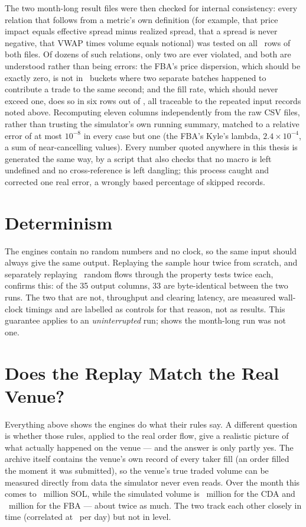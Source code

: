 The two month-long result files were then checked for internal consistency: every
relation that follows from a metric's own definition (for example, that price
impact equals effective spread minus realized spread, that a spread is never
negative, that VWAP times volume equals notional) was tested on all \VerRows\ rows
of both files. Of dozens of such relations, only two are ever violated, and both are
understood rather than being errors: the FBA's price dispersion, which should be
exactly zero, is not in \VerDispRows\ buckets where two separate batches happened to
contribute a trade to the same second; and the fill rate, which should never exceed
one, does so in six rows out of \VerFillRows, all traceable to the repeated input
records noted above. Recomputing eleven columns independently from the raw CSV
files, rather than trusting the simulator's own running summary, matched to a
relative error of at most $10^{-8}$ in every case but one (the FBA's Kyle's lambda,
$2.4\times10^{-4}$, a sum of near-cancelling values). Every number quoted anywhere in
this thesis is generated the same way, by a script that also checks that no macro is
left undefined and no cross-reference is left dangling; this process caught and
corrected one real error, a wrongly based percentage of skipped records.

\section{Determinism}
\label{sec:testdeterminism}

The engines contain no random numbers and no clock, so the same input should always
give the same output. Replaying the sample hour twice from scratch, and separately
replaying \VerDetReplays\ random flows through the property tests twice each,
confirms this: of the 35 output columns, 33 are byte-identical between the two runs.
The two that are not, throughput and clearing latency, are measured wall-clock
timings and are labelled as controls for that reason, not as results. This
guarantee applies to an \emph{uninterrupted} run;  shows the
month-long run was not one.

\section{Does the Replay Match the Real Venue?}
\label{sec:testfidelity}

Everything above shows the engines do what their rules say. A different question is
whether those rules, applied to the real order flow, give a realistic picture of
what actually happened on the venue --- and the answer is only partly yes. The
archive itself contains the venue's own record of every taker fill (an order filled
the moment it was submitted), so the venue's true traded volume can be measured
directly from data the simulator never even reads. Over the month this comes to
\VerVenueVol\ million SOL, while the simulated volume is \VerCdaVol\ million for the
CDA and \VerFbaVol\ million for the FBA --- about twice as much. The two track each
other closely in time (correlated at \VerCorrDay\ per day) but not in level.

